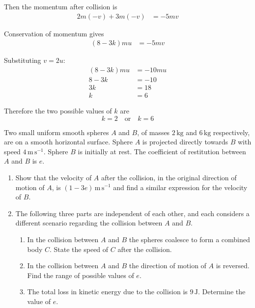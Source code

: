 \documentclass[leqno]{article}
\begin{document}
\begin{enumerate}[
  label=\textbf{\arabic*.},
  leftmargin=*,
  topsep=0pt,
  partopsep=0pt,
  parsep=0pt
]
\begin{djsSolution}
\begin{enumerate}[label=\textbf{(\alph*)}]
  Then the momentum after collision is
  \begin{align*}
  2m(-v)+3m(-v)&=-5mv
  \end{align*}

  Conservation of momentum gives
  \begin{align*}
  (8-3k)mu&=-5mv
  \end{align*}

  Substituting $v=2u$:
  \begin{align*}
  (8-3k)mu&=-10mu \\
  8-3k&=-10 \\
  3k&=18 \\
  k&=6
  \end{align*}

  Therefore the two possible values of $k$ are
  \[
  k=2 \quad \text{or} \quad k=6
  \]
\end{enumerate}
\end{djsSolution}


\newpage

\questionitem

Two small uniform smooth spheres $A$ and $B$, of masses $2\,\mathrm{kg}$ and $6\,\mathrm{kg}$ respectively, are on a smooth horizontal surface. Sphere $A$ is projected directly towards $B$ with speed $4\,\mathrm{m}\,\mathrm{s}^{-1}$. Sphere $B$ is initially at rest. The coefficient of restitution between $A$ and $B$ is $e$. \\
\begin{enumerate}[label=\textbf{(\alph*)}]
  \item Show that the velocity of $A$ after the collision, in the original direction of motion of $A$, is $(1-3e)\,\mathrm{m}\,\mathrm{s}^{-1}$ and find a similar expression for the velocity of $B$.  \\
  \item The following three parts are independent of each other, and each considers a different scenario regarding the collision between $A$ and $B$. \\
  \begin{enumerate}[label=(\roman*)]
    \item In the collision between $A$ and $B$ the spheres coalesce to form a combined body $C$. State the speed of $C$ after the collision. 
    \item In the collision between $A$ and $B$ the direction of motion of $A$ is reversed. Find the range of possible values of $e$. 
    \item The total loss in kinetic energy due to the collision is $9\,\mathrm{J}$. Determine the value of $e$.  \\
  \end{enumerate}
\end{enumerate}


\end{enumerate}
\end{document}
